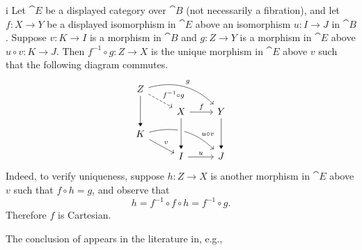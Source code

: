 \begin{partsolution}{i}
Let \(\cat{E}\) be a displayed category over \(\cat{B}\) (not necessarily a fibration), and let \(f : X \to Y\) be a displayed isomorphism in \(\cat{E}\) above an isomorphism \(u : I \to J\) in \(\cat{B}\).
Suppose \(v : K \to I\) is a morphism in \(\cat{B}\) and \(g : Z \to Y\) is a morphism in \(\cat{E}\) above \(u \circ v : K \to J\). Then \(f^{-1} \circ g : Z \to X\) is the unique morphism in \(\cat{E}\) above \(v\) such that the following diagram commutes.
\begin{equation*}
\begin{tikzcd}[row sep=small]
Z \arrow[rd, dashed, "f^{-1} \circ g"] \arrow[rrd, bend left, "g"] \arrow[dd, -Triangle] \\
& X \arrow[r, "f"] & Y \arrow[dd, -Triangle] \\
K \arrow[rd, "v"] \arrow[rrd, bend left, near end, "u \circ v"] \\
& I \arrow[r, "u"] & J
\arrow[from=uul, to=l, -Triangle, crossing over]
\end{tikzcd}
\end{equation*}
Indeed, to verify uniqueness, suppose \(h : Z \to X\) is another morphism in \(\cat{E}\) above \(v\) such that \(f \circ h = g\), and observe that
\begin{equation*}
h = f^{-1} \circ f \circ h = f^{-1} \circ g.
\end{equation*}
Therefore \(f\) is Cartesian.
\end{partsolution}

\begin{remark}
The conclusion of  appears in the literature in, e.g., \cite[Lemma~8.1.4(i)]{MR1291599}
\end{remark}

